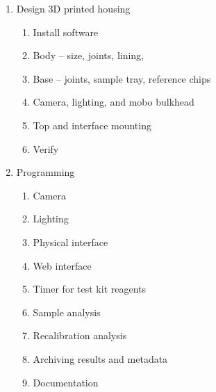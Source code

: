 \documentclass{article}
\begin{document}
\begin{enumerate}[label=\arabic*.]
\item Design 3D printed housing
\begin{enumerate}[label=\alph*)]
    \item Install software
    \item Body -- size, joints, lining,
    \item Base -- joints, sample tray, reference chips
    \item Camera, lighting, and mobo bulkhead
    \item Top and interface mounting
    \item Verify
\end{enumerate}

\item Programming
\begin{enumerate}[label=\alph*)]
    \item Camera
    \item Lighting
    \item Physical interface
    \item Web interface
    \item Timer for test kit reagents
    \item Sample analysis
    \item Recalibration analysis
    \item Archiving results and metadata
    \item Documentation
\end{enumerate}

\end{enumerate}
\end{document}
